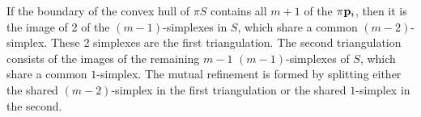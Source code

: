 \begin{Theorem}
\label{two-simplex-case}
If the boundary of the convex hull of $\pi S$
contains all $m+1$ of the $\pi {\mathbf p}_i$,
then it is the image of 2 of the $(m-1)$-simplexes in $S$,
which share a common $(m-2)$-simplex.
These 2 simplexes are the first triangulation.
The second triangulation consists of the images
of the remaining $m-1$ $(m-1)$-simplexes of $S$,
which share a common $1$-simplex.
The mutual refinement is formed by splitting either
the shared $(m-2)$-simplex in the first triangulation
or the shared $1$-simplex in the second.
\end{Theorem}



